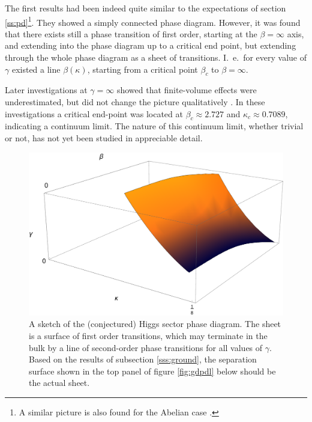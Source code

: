 \documentclass[final,twoside,12pt]{article}
\newcommand*{\1}{1\!\!\!\bot}
\begin{document}
The first results had been indeed quite similar \cite{Kuhnelt:1983mw,Gerdt:1984ft,Evertz:1985fc,Langguth:1985eu,Langguth:1985dr,Gerdt:1985rb,Evertz:1986vp} to the expectations of section \ref{ss:pd}\footnote{A similar picture is also found for the Abelian case \cite{Jansen:1985nh}.}. They showed a simply connected phase diagram. However, it was found that there exists still a phase transition of first order, starting at the $\beta=\infty$ axis, and extending into the phase diagram up to a critical end point, but extending through the whole phase diagram as a sheet of transitions. I.\ e.\ for every value of $\gamma$ existed a line $\beta(\kappa)$, starting from a critical point $\beta_c$ to $\beta=\infty$.

Later investigations at $\gamma=\infty$ showed that finite-volume effects were underestimated, but did not change the picture qualitatively \cite{Bonati:2009pf,Bonati:2009yi}. In these investigations a critical end-point was located at $\beta_c\approx2.727$ and $\kappa_c\approx0.7089$, indicating a continuum limit. The nature of this continuum limit, whether trivial or not, has not yet been studied in appreciable detail.

\begin{figure}[!htbp]
\begin{minipage}{0.7\linewidth}
 \includegraphics[width=\linewidth]{pd-final}
\end{minipage}
\begin{minipage}{0.3\linewidth}
 \caption{\label{fig:pd}A sketch of the (conjectured) Higgs sector phase diagram. The sheet is a surface of first order transitions, which may terminate in the bulk by a line of second-order phase transitions for all values of $\gamma$. Based on the results of subsection \ref{sss:ground}, the separation surface shown in the top panel of figure \ref{fig:gdpdl} below should be the actual sheet.}
\end{minipage}
\end{figure}
\end{document}
